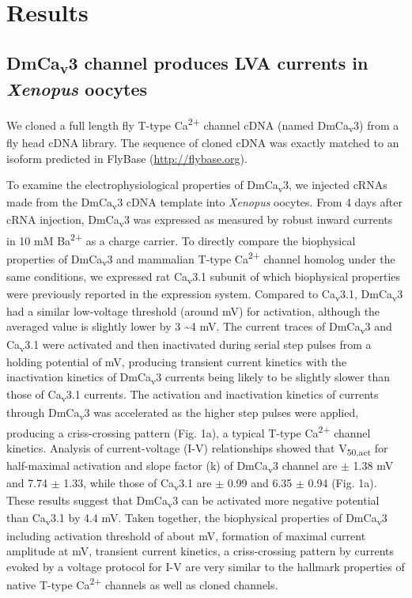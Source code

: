 \section*{Results}

\subsection*{DmCa\textsubscript{v}3 channel produces LVA currents in \emph{Xenopus} oocytes}

We cloned a full length fly T-type Ca\textsuperscript{2+} channel cDNA (named DmCa\textsubscript{v}3) from a fly head cDNA library. 
The sequence of cloned cDNA was exactly matched to an isoform predicted in FlyBase (\href{http://}{http://flybase.org}). 

To examine the electrophysiological properties of DmCa\textsubscript{v}3, we injected cRNAs made from the DmCa\textsubscript{v}3 cDNA template into \emph{Xenopus} oocytes.
From 4 days after cRNA injection, DmCa\textsubscript{v}3 was expressed as measured by robust inward currents in 10 mM Ba\textsuperscript{2+} as a charge carrier.
To directly compare the biophysical properties of DmCa\textsubscript{v}3 and mammalian T-type Ca\textsuperscript{2+} channel homolog under the same conditions, we expressed rat Ca\textsubscript{v}3.1 subunit of which biophysical properties were previously reported in the expression system\cite{9495342}.
Compared to Ca\textsubscript{v}3.1, DmCa\textsubscript{v}3 had a similar low-voltage threshold (around  mV) for activation, although the averaged value is slightly lower by 3 \sim 4 mV.
The current traces of DmCa\textsubscript{v}3 and Ca\textsubscript{v}3.1 were activated and then inactivated during serial step pulses from a holding potential of  mV, producing transient current kinetics with the inactivation kinetics of DmCa\textsubscript{v}3 currents being likely to be slightly slower than those of Ca\textsubscript{v}3.1 currents.
The activation and inactivation kinetics of currents through DmCa\textsubscript{v}3 was accelerated as the higher step pulses were applied, producing a criss-crossing pattern (Fig. 1a), a typical T-type Ca\textsuperscript{2+} channel kinetics.
Analysis of current-voltage (I-V) relationships showed that V\textsubscript{50,act} for half-maximal activation and slope factor (k) of DmCa\textsubscript{v}3 channel are  $\pm$ 1.38 mV and 7.74 $\pm$ 1.33, while those of Ca\textsubscript{v}3.1 are  $\pm$ 0.99 and 6.35 $\pm$ 0.94 (Fig. 1a).
These results suggest that DmCa\textsubscript{v}3 can be activated more negative potential than Ca\textsubscript{v}3.1 by 4.4 mV.
Taken together, the biophysical properties of DmCa\textsubscript{v}3 including activation threshold of about  mV, formation of maximal current amplitude at  mV, transient current kinetics, a criss-crossing pattern by currents evoked by a voltage protocol for I-V are very similar to the hallmark properties of native T-type Ca\textsuperscript{2+} channels as well as cloned channels\cite{9495342}.

